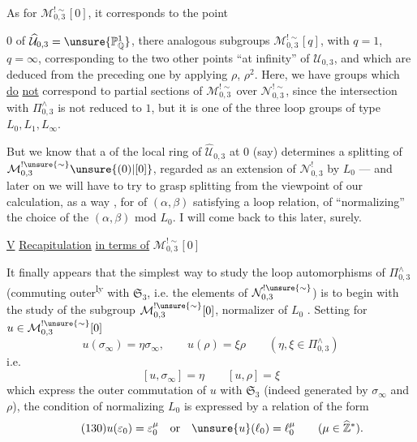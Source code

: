 As for $\mathcal M_{0,3}^{!\sim}[0]$, it corresponds
 to the point


$0$ of $\widehat{\mathcal U}_{0,3}=\unsure{\mathbb P^1_{\mathbb Q}}$,
there 
analogous subgroups $\mathcal M_{0,3}^{!\sim}[q]$, with
$q=1$, $q=\infty$, corresponding to the two other points ``at infinity''
of $\mathcal U_{0,3}$, and which are deduced from the preceding one by applying
$\rho$, $\rho^2$.
Here, we have groups which \uline{do} \uline{not} correspond
 to  partial sections
of $\mathcal M_{0,3}^{!\sim}$ over $\mathcal N_{0,3}^{!\sim}$,
since the intersection with $\Pi_{0,3}^{\wedge}$ is not reduced to $1$,
but it is one of the three loop groups of type $L_0,L_1,L_\infty$.

But we know that a 
of the local ring of $\widehat{\mathcal U}_{0,3}$ at $0$ (say)
determines a splitting of
$\mathcal M_{0,3}^{!\unsure{\sim}}\unsure{(0)|[0]}$, regarded as
an extension of $\mathcal N_{0,3}^{!}$ by $L_0$ --- and later on we will have to
try to grasp 
splitting 
from the viewpoint of our calculation, as a  way
, for 
\deleted{$\alpha,\beta$}   of $(\alpha,\beta)$
satisfying a loop relation, of ``normalizing'' the choice of the
$(\alpha,\beta)$ mod $L_0$.
I will come back to this later, surely.


\uline{V} \uline{Recapitulation} \uline{in terms of}
$\mathcal M_{0,3}^{!\sim}[0]$

It finally appears that the simplest way to study the loop
automorphisms of $\Pi_{0,3}^{\wedge}$ (commuting outer\textsuperscript{ly}
with $\mathfrak S_3$, i.e. the elements of 
$\mathcal N_{0,3}^{!\unsure{\sim}}$) is to begin with the study of the
subgroup $\mathcal M_{0,3}^{!\unsure{\sim}}[0]$, normalizer
of $L_0$ .
Setting for $u\in\mathcal M_{0,3}^{!\unsure{\sim}}[0]$
\[
\tag{128}
u(\sigma_\infty)=\eta\sigma_\infty,
\qquad u(\rho)=\xi\rho
\qquad(\eta,\xi\in\Pi_{0,3}^{\wedge})
\]
i.e.
\[
\tag{129}
[u,\sigma_\infty]=\eta\qquad [u,\rho]=\xi
\]
which express the outer commutation of $u$ with $\mathfrak S_3$
(indeed generated by $\sigma_\infty$ and $\rho$), the condition of
normalizing $L_0$ is expressed by a relation of the form
\[
\tag{130}
u(\varepsilon_0)=\varepsilon_0^\mu
\quad\text{or}\quad \unsure{u}(\ell_0)=\ell_0^\mu
\qquad(\mu\in\widehat{\mathbb Z}^{*}).
\]

